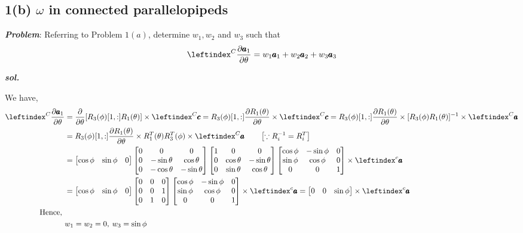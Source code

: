 \subsection{1(b) $\omega$ in connected parallelopipeds}
\textbf{\textit{Problem}}: Referring to Problem $1(a)$, determine $w_1, w_2$ and  $w_3$ such that
$$ \lx{^C}{\frac{\partial \pmb a_1}{\partial \theta}} = w_1 \pmb a_1 + w_2 \pmb a_2 + w_3 \pmb a_3$$

\textbf{\textit{sol.}}

We have,
\begin{align*}
    \lx{^C}{\frac{\partial \pmb a_1}{\partial \theta}}  &=
    \frac{\partial}{\partial \theta} [R_3(\phi)[1,:]R_1(\theta)] \times \lx{^C}{\pmb c}
    = R_3(\phi)[1,:] \frac{\partial R_1(\theta)}{\partial \theta} \times \lx{^C}{\pmb c}
    = R_3(\phi)[1,:] \frac{\partial R_1(\theta)}{\partial \theta} \times [R_3(\phi)R_1(\theta)]^{-1} \times \lx{^C}{\pmb a}\\
    &=R_3(\phi)[1,:] \frac{\partial R_1(\theta)}{\partial \theta} \times R_1^T(\theta) R_3^T(\phi)\times \lx{^C}{\pmb a}
    \qquad \left[ \because R_i^{-1} = R_i^T \right]\\
    &= \bm{\cos \phi & \sin \phi  & 0}
    \bm{
            0 & 0 & 0\\
            0 & -\sin \theta & \cos \theta\\
            0 & -\cos \theta & -\sin \theta
        }
    \bm{
            1 & 0 & 0\\
            0 & \cos \theta & -\sin \theta\\
            0 & \sin \theta & \cos \theta
    }
    \bm{
            \cos \phi & -\sin \phi  & 0\\
            \sin \phi & \cos \phi & 0\\
            0          & 0         & 1
        }
    \times \lx{^c}{\pmb a}\\
    &= \bm{\cos \phi & \sin \phi  & 0}
    \bm{
            0 & 0 & 0\\
            0 & 0 & 1\\
            0 & 1 & 0
        }
    \bm{
            \cos \phi & -\sin \phi  & 0\\
            \sin \phi & \cos \phi & 0\\
            0          & 0         & 1
        }
    \times \lx{^c}{\pmb a}
    = \bm{0 & 0 & \sin \phi} \times \lx{^c}{\pmb a}\\
    \text{Hence, }&\\
    & w_1 = w_2 = 0, \: w_3 = \sin \phi
\end{align*}
